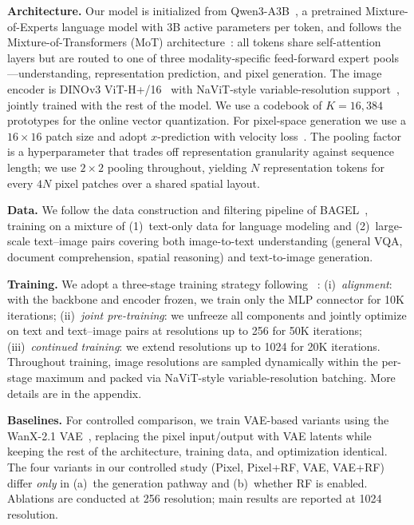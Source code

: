 \documentclass{llmxive}
\begin{document}
\textbf{Architecture.}
Our model is initialized from Qwen3-A3B~\cite{qwen3}, a pretrained Mixture-of-Experts language model with 3B active parameters per token, and follows the Mixture-of-Transformers (MoT) architecture~\cite{bagel}: all tokens share self-attention layers but are routed to one of three modality-specific feed-forward expert pools---understanding, representation prediction, and pixel generation. The image encoder is DINOv3 ViT-H+/16~\cite{dinov3} with NaViT-style variable-resolution support~\cite{navit}, jointly trained with the rest of the model. We use a codebook of $K{=}16{,}384$ prototypes for the online vector quantization. For pixel-space generation we use a $16{\times}16$ patch size and adopt $x$-prediction with velocity loss~\cite{jit}. The pooling factor is a hyperparameter that trades off representation granularity against sequence length; we use $2{\times}2$ pooling throughout, yielding $N$ representation tokens for every $4N$ pixel patches over a shared spatial layout.



\textbf{Data.}
We follow the data construction and filtering pipeline of BAGEL~\cite{bagel}, training on a mixture of (1)~text-only data for language modeling and (2)~large-scale text--image pairs covering both image-to-text understanding (general VQA, document comprehension, spatial reasoning) and text-to-image generation.

\textbf{Training.}
We adopt a three-stage training strategy following ~\cite{bagel}: (i)~\emph{alignment}: with the backbone and encoder frozen, we train only the MLP connector for 10K iterations; (ii)~\emph{joint pre-training}: we unfreeze all components and jointly optimize on text and text--image pairs at resolutions up to 256 for 50K iterations; (iii)~\emph{continued training}: we extend resolutions up to 1024 for 20K iterations. Throughout training, image resolutions are sampled dynamically within the per-stage maximum and packed via NaViT-style variable-resolution batching.  More details are in the appendix.




\textbf{Baselines.}
For controlled comparison, we train VAE-based variants using the WanX-2.1 VAE~\cite{wanx}, replacing the pixel input/output with VAE latents while keeping the rest of the architecture, training data, and optimization identical. The four variants in our controlled study (Pixel, Pixel+RF, VAE, VAE+RF) differ \emph{only} in (a)~the generation pathway and (b)~whether RF is enabled. Ablations are conducted at 256 resolution; main results are reported at 1024 resolution.
\end{document}
